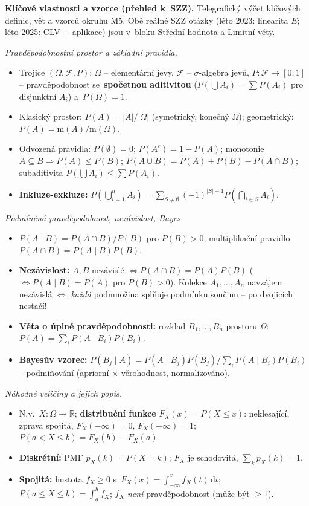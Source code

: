 \documentclass[11pt,a4paper]{article}
\newcommand{\R}{\mathbb{R}}
\begin{document}
\begin{poznamka}
\textbf{Klíčové vlastnosti a vzorce (přehled k~SZZ).} Telegrafický výčet klíčových definic, vět a vzorců okruhu M5. Obě reálné SZZ otázky (léto 2023: linearita $E$; léto 2025: CLV + aplikace) jsou v~bloku Střední hodnota a Limitní věty.

\smallskip
\emph{Pravděpodobnostní prostor a základní pravidla.}
\begin{itemize}
  \item Trojice $(\Omega,\mathcal{F},P)$: $\Omega$ -- elementární jevy, $\mathcal{F}$ -- $\sigma$-algebra jevů, $P\colon\mathcal{F}\to[0,1]$ -- pravděpodobnost se~\textbf{spočetnou aditivitou} ($P(\bigcup A_i)=\sum P(A_i)$ pro disjunktní $A_i$) a~$P(\Omega)=1$.
  \item Klasický prostor: $P(A)=|A|/|\Omega|$ (symetrický, konečný $\Omega$); geometrický: $P(A)=\mathrm{m}(A)/\mathrm{m}(\Omega)$.
  \item Odvozená pravidla: $P(\emptyset)=0$; $P(A^c)=1-P(A)$; monotonie $A\subseteq B\Rightarrow P(A)\le P(B)$; $P(A\cup B)=P(A)+P(B)-P(A\cap B)$; subaditivita $P(\bigcup A_i)\le\sum P(A_i)$.
  \item \textbf{Inkluze-exkluze:} $P(\bigcup_{i=1}^n A_i)=\sum_{S\ne\emptyset}(-1)^{|S|+1}P(\bigcap_{i\in S}A_i)$.
\end{itemize}

\smallskip
\emph{Podmíněná pravděpodobnost, nezávislost, Bayes.}
\begin{itemize}
  \item $P(A\mid B)=P(A\cap B)/P(B)$ pro $P(B)>0$; multiplikační pravidlo $P(A\cap B)=P(A\mid B)P(B)$.
  \item \textbf{Nezávislost:} $A,B$ nezávislé $\iff P(A\cap B)=P(A)P(B)$ ($\iff P(A\mid B)=P(A)$ pro $P(B)>0$). Kolekce $A_1,\dots,A_n$ navzájem nezávislá $\iff$ \emph{každá} podmnožina splňuje podmínku součinu -- po dvojicích nestačí!
  \item \textbf{Věta o úplné pravděpodobnosti:} rozklad $B_1,\dots,B_n$ prostoru $\Omega$: $P(A)=\sum_i P(A\mid B_i)P(B_i)$.
  \item \textbf{Bayesův vzorec:} $P(B_j\mid A)=P(A\mid B_j)P(B_j)\big/\sum_i P(A\mid B_i)P(B_i)$ --  podmiňování (apriorní $\times$ věrohodnost, normalizováno).
\end{itemize}

\smallskip
\emph{Náhodné veličiny a jejich popis.}
\begin{itemize}
  \item N.v.\ $X\colon\Omega\to\R$; \textbf{distribuční funkce} $F_X(x)=P(X\le x)$: neklesající, zprava spojitá, $F_X(-\infty)=0$, $F_X(+\infty)=1$; $P(a<X\le b)=F_X(b)-F_X(a)$.
  \item \textbf{Diskrétní:} PMF $p_X(k)=P(X=k)$; $F_X$ je schodovitá, $\sum_k p_X(k)=1$.
  \item \textbf{Spojitá:} hustota $f_X\ge 0$ s~$F_X(x)=\int_{-\infty}^{x}f_X(t)\,\mathrm{d}t$; $P(a\le X\le b)=\int_a^b f_X$; $f_X$ \emph{není} pravděpodobnost (může být $>1$).
\end{itemize}


\end{poznamka}
\end{document}
